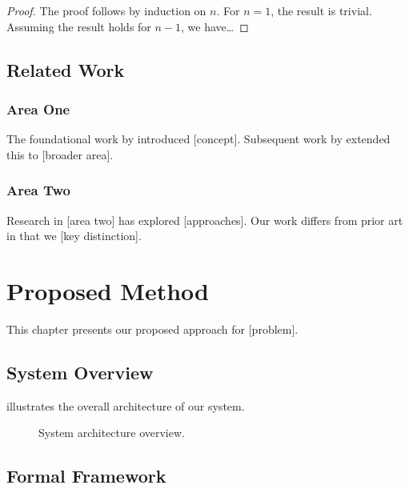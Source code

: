 \documentclass[12pt,a4paper,oneside]{book}
\theoremstyle{plain}
\theoremstyle{definition}
\theoremstyle{remark}
\begin{document}
\begin{proof}
The proof follows by induction on $n$. For $n = 1$, the result is trivial. Assuming the result holds for $n-1$, we have\ldots
\end{proof}

\section{Related Work}

\subsection{Area One}

The foundational work by \citet{he2016deep} introduced [concept]. Subsequent work by \citet{goodfellow2016deep} extended this to [broader area].

\subsection{Area Two}

Research in [area two] has explored [approaches]. Our work differs from prior art in that we [key distinction].

\chapter{Proposed Method}
\label{ch:method}

This chapter presents our proposed approach for [problem].

\section{System Overview}

 illustrates the overall architecture of our system.

\begin{figure}[tbp]
\centering
{}
\caption{System architecture overview.}
\label{fig:architecture}
\end{figure}

\section{Formal Framework}
\end{document}
